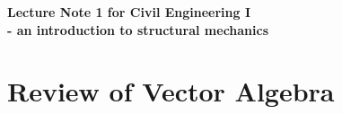 \documentclass[10pt,a4j]{article}
\newlength{\minitwocolumn}
\begin{document}
\newcommand{\fat}[1]{\mbox{\boldmath $#1$}}
\newcommand{\D}{\partial}
\newcommand{\w}{\omega}
\newcommand{\ga}{\alpha}
\newcommand{\gb}{\beta}
\newcommand{\gx}{\xi}
\newcommand{\gz}{\zeta}
\newcommand{\vhat}[1]{\hat{\fat{#1}}}
\newcommand{\spc}{\vspace{0.7\baselineskip}}
\newcommand{\halfspc}{\vspace{0.3\baselineskip}}

\newcommand{\twofig}[2]
 {
   \begin{figure}
     \begin{minipage}[t]{\minitwocolumn}
         \begin{center}   #1
         \end{center}
     \end{minipage}
         \hspace{\columnsep}
     \begin{minipage}[t]{\minitwocolumn}
         \begin{center} #2
         \end{center}
     \end{minipage}
   \end{figure}
 }
\begin{center}
	{\Large \bf Lecture Note 1 for Civil Engineering I \\ - an introduction to structural mechanics}  
\end{center}
\section{Review of Vector Algebra}
\end{document}
